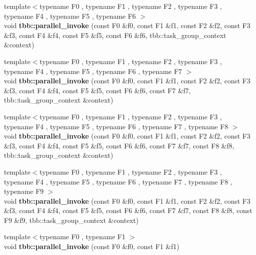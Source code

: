 \begin{DoxyCompactItemize}
\item 
\hypertarget{group__algorithms_gad8c1220bbd59e3b8e7bbcdcfdda8047e}{}{\footnotesize template$<$typename F0 , typename F1 , typename F2 , typename F3 , typename F4 , typename F5 , typename F6 $>$ }\\void {\bfseries tbb\+::parallel\+\_\+invoke} (const F0 \&f0, const F1 \&f1, const F2 \&f2, const F3 \&f3, const F4 \&f4, const F5 \&f5, const F6 \&f6, tbb\+::task\+\_\+group\+\_\+context \&context)\label{group__algorithms_gad8c1220bbd59e3b8e7bbcdcfdda8047e}

\item 
\hypertarget{group__algorithms_ga5ee83a66397ee0b15c77756cb5e5168e}{}{\footnotesize template$<$typename F0 , typename F1 , typename F2 , typename F3 , typename F4 , typename F5 , typename F6 , typename F7 $>$ }\\void {\bfseries tbb\+::parallel\+\_\+invoke} (const F0 \&f0, const F1 \&f1, const F2 \&f2, const F3 \&f3, const F4 \&f4, const F5 \&f5, const F6 \&f6, const F7 \&f7, tbb\+::task\+\_\+group\+\_\+context \&context)\label{group__algorithms_ga5ee83a66397ee0b15c77756cb5e5168e}

\item 
\hypertarget{group__algorithms_ga1af92ebd06f6cdf5ee668b1fe62657bd}{}{\footnotesize template$<$typename F0 , typename F1 , typename F2 , typename F3 , typename F4 , typename F5 , typename F6 , typename F7 , typename F8 $>$ }\\void {\bfseries tbb\+::parallel\+\_\+invoke} (const F0 \&f0, const F1 \&f1, const F2 \&f2, const F3 \&f3, const F4 \&f4, const F5 \&f5, const F6 \&f6, const F7 \&f7, const F8 \&f8, tbb\+::task\+\_\+group\+\_\+context \&context)\label{group__algorithms_ga1af92ebd06f6cdf5ee668b1fe62657bd}

\item 
\hypertarget{group__algorithms_ga65846bc3b2f63ed1448b6cdfea9e1c80}{}{\footnotesize template$<$typename F0 , typename F1 , typename F2 , typename F3 , typename F4 , typename F5 , typename F6 , typename F7 , typename F8 , typename F9 $>$ }\\void {\bfseries tbb\+::parallel\+\_\+invoke} (const F0 \&f0, const F1 \&f1, const F2 \&f2, const F3 \&f3, const F4 \&f4, const F5 \&f5, const F6 \&f6, const F7 \&f7, const F8 \&f8, const F9 \&f9, tbb\+::task\+\_\+group\+\_\+context \&context)\label{group__algorithms_ga65846bc3b2f63ed1448b6cdfea9e1c80}

\item 
\hypertarget{group__algorithms_ga6b1c36ece1d3950677dd01ef0863648c}{}{\footnotesize template$<$typename F0 , typename F1 $>$ }\\void {\bfseries tbb\+::parallel\+\_\+invoke} (const F0 \&f0, const F1 \&f1)\label{group__algorithms_ga6b1c36ece1d3950677dd01ef0863648c}


\end{DoxyCompactItemize}
